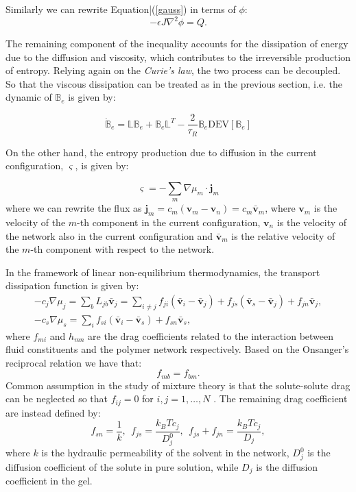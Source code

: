 \documentclass[12pt]{extarticle}
\begin{document}
Similarly we can rewrite Equation|(\ref{gauss}) in terms of $\phi$:
\begin{equation}
-\epsilon J \nabla^2 \phi = Q.
\end{equation}

The remaining component of the inequality accounts for the dissipation of energy due to the diffusion and viscosity, which contributes to the irreversible production of entropy. Relying again on the \textit{Curie's law}, the two process can be decoupled. So that the viscous dissipation can be treated as in the previous section, i.e. the dynamic of $\mathbb{B}_e$ is given by:

\begin{equation}
\dot{\mathbb{B}}_e = \mathbb{L}\mathbb{B}_e + \mathbb{B}_e \mathbb{L}^T - \frac{2}{\tau_R}\mathbb{B}_e \text{DEV}[\mathbb{B}_e]
\end{equation}

On the other hand, the entropy production due to diffusion in the current configuration, $\varsigma$, is given by: 

\begin{equation}
\varsigma= -\sum_m \nabla \mu_m \cdot \mathbf{j}_m
\end{equation} 
where we can rewrite the flux as $\mathbf{j}_m = c_m (\mathbf{v}_m-\mathbf{v}_n)= c_m \bar{\mathbf{v}}_{m}$, where $\mathbf{v}_m$ is the velocity of the $m$-th component in the current configuration, $\mathbf{v}_n$ is the velocity of the network also in the current configuration and  $\bar{\mathbf{v}}_{m}$ is the relative velocity of the $m$-th component with respect to the network. 

In the framework of linear non-equilibrium thermodynamics, the transport dissipation function is given by:
\begin{eqnarray}
-c_j \nabla \mu_j = \sum_b L_{jb} \bar{\mathbf{v}}_j= \sum_{i\neq j} f_{ji} \left(\bar{\mathbf{v}}_i-\bar{\mathbf{v}}_j\right) + f_{js} (\bar{\mathbf{v}}_s-\bar{\mathbf{v}}_j) + f_{jn} \bar{\mathbf{v}}_j,\label{drag1}\\
-c_s \nabla \mu_s = \sum_i f_{si} \left(\bar{\mathbf{v}}_i-\bar{\mathbf{v}}_s\right)+ f_{sn} \bar{\mathbf{v}}_s,
\end{eqnarray}
where $f_{mi}$ and $h_{mn}$ are the drag coefficients related to the interaction between fluid constituents and the polymer network respectively. Based on the Onsanger's reciprocal relation we have that:
\begin{equation}
f_{mb}=f_{bm}.
\end{equation}
Common assumption in the study of mixture theory is that the solute-solute drag can be neglected so that $f_{ij}=0$ for $i,j=1,\ldots,N$ \cite{ecm,bookbiophys}. The remaining drag coefficient are instead defined by:
\begin{equation}
f_{sn} = \frac{1}{k}, \ \ f_{js}=\frac{k_BT c_j}{D^0_{j}},\ \  f_{js}+f_{jn}= \frac{k_BT c_j}{D_j}, \label{drag2}
\end{equation}
where $k$ is the hydraulic permeability of the solvent in the network, $D^0_j$ is the diffusion coefficient of the solute in pure solution, while $D_j$ is the diffusion coefficient in the gel.
\end{document}
